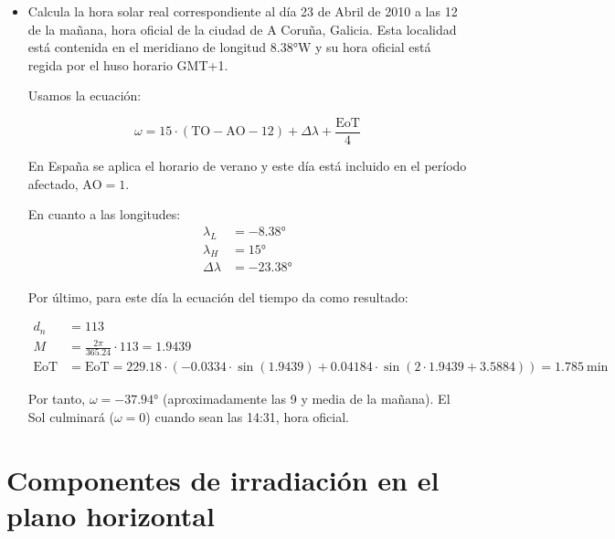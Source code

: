 \begin{itemize}
\item Calcula la hora solar real correspondiente al día 23 de Abril de
  2010 a las 12 de la mañana, hora oficial de la ciudad de A Coruña,
  Galicia. Esta localidad está contenida en el meridiano de longitud
  $\ang{8.38}\mathrm{W}$ y su hora oficial está regida por el huso
  horario GMT+1.

  Usamos la ecuación:
  
  \[
    \omega=15\cdot(\mathrm{TO}-\mathrm{AO}-12)+\Delta\lambda+\frac{\mathrm{EoT}}{4}
  \]

  En España se aplica el horario de verano y este día está incluido en
  el período afectado, $\mathrm{AO}=1$.

  En cuanto a las longitudes:
  \begin{align*}
    \lambda_{L} &= -\ang{8.38}\\
    \lambda_{H} &= \ang{15}\\
    \Delta\lambda &= \ang{-23.38}
  \end{align*}
  

  Por último, para este día la ecuación del tiempo da como resultado:

  \begin{align*}
    d_n &= 113\\
    M &=\frac{2\pi}{365.24}\cdot 113 = 1.9439\\
    \mathrm{EoT}&=\mathrm{EoT}=229.18\cdot\left(-0.0334\cdot\sin(1.9439) + 0.04184\cdot\sin\left(2\cdot
                  1.9439 + 3.5884\right)\right) = \SI{1.785}{\minute}
  \end{align*}
  
  Por tanto, $\omega=\ang{-37.94}$ (aproximadamente las 9 y media de
  la mañana). El Sol culminará ($\omega=0$) cuando sean las 14:31,
  hora oficial.

\end{itemize}



\section{Componentes de irradiación en el plano horizontal}


